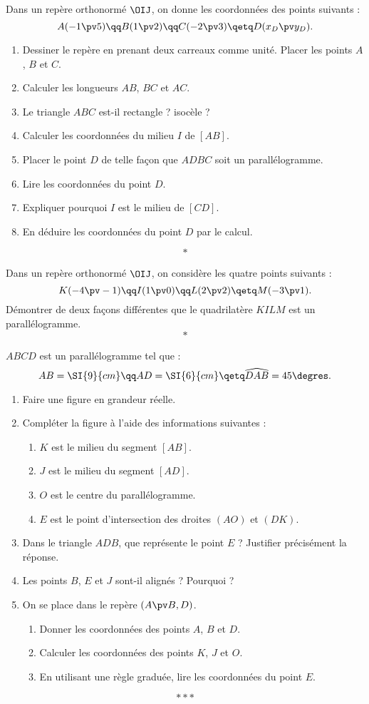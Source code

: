 \documentclass[10pt,openright,twoside,french]{book}
\begin{document}

\exo Dans un repère orthonormé $\OIJ$, on donne les coordonnées des points suivants :
\[A(-1\pv5) \qq B(1 \pv 2) \qq C(-2 \pv 3) \qetq D(x_D \pv y_D).\]

\begin{enumerate}
    \item Dessiner le repère en prenant deux carreaux comme unité. Placer les points $A$, $B$ et $C$.
    \item Calculer les longueurs $AB$, $BC$ et $AC$.
    \item Le triangle $ABC$ est-il rectangle ? isocèle ?
    \item Calculer les coordonnées du milieu $I$ de $[AB]$.
    \item Placer le point $D$ de telle façon que $ADBC$ soit un parallélogramme.
    \item Lire les coordonnées du point $D$.
    \item Expliquer pourquoi $I$ est le milieu de $[CD]$.
    \item En déduire les coordonnées du point $D$ par le calcul.
\end{enumerate}\[*\]

\exo Dans un repère orthonormé $\OIJ$, on considère les quatre points suivants :
\[K(-4 \pv -1) \qq I(1 \pv 0) \qq L(2 \pv 2) \qetq M(-3 \pv 1).\]
Démontrer de deux façons différentes que le quadrilatère $KILM$ est un parallélogramme.
\[*\]

\exo $ABCD$ est un parallélogramme tel que :
\[AB = \SI{9}{cm} \qq AD = \SI{6}{cm} \qetq \widehat{DAB} = 45\degres.\]
\begin{enumerate}
    \item Faire une figure en grandeur réelle.
    \item Compléter la figure à l'aide des informations suivantes :
    \begin{enumerate}
        \item $K$ est le milieu du segment $[AB]$.
        \item $J$ est le milieu du segment $[AD]$.
        \item $O$ est le centre du parallélogramme.
        \item $E$ est le point d'intersection des droites $(AO)$ et $(DK)$.
    \end{enumerate}
    \item Dans le triangle $ADB$, que représente le point $E$ ? Justifier précisément la réponse.
    \item Les points $B$, $E$ et $J$ sont-il alignés ? Pourquoi ?
    \item On se place dans le repère $(A \pv B, D)$.
    \begin{enumerate}
        \item Donner les coordonnées des points $A$, $B$ et $D$.
        \item Calculer les coordonnées des points $K$, $J$ et $O$.
        \item En utilisant une règle graduée, lire les coordonnées du point $E$.
    \end{enumerate}
\end{enumerate}
\[***\]
\end{document}
